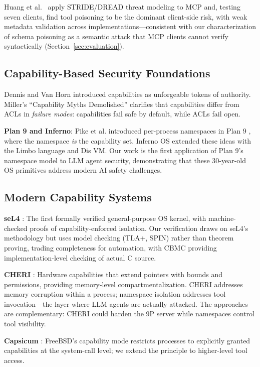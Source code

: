 \documentclass[acmsmall,screen,review]{acmart}
\begin{document}
Huang et al.\ \cite{huang2026mcpthreat} apply STRIDE/DREAD threat modeling to MCP and, testing seven clients, find tool poisoning to be the dominant client-side risk, with weak metadata validation across implementations---consistent with our characterization of schema poisoning as a semantic attack that MCP clients cannot verify syntactically (Section~\ref{sec:evaluation}).

\subsection{Capability-Based Security Foundations}

Dennis and Van Horn \cite{dennis1966capabilities} introduced capabilities as unforgeable tokens of authority. Miller's ``Capability Myths Demolished'' \cite{miller2006capability} clarifies that capabilities differ from ACLs in \textit{failure modes}: capabilities fail safe by default, while ACLs fail open.

\textbf{Plan 9 and Inferno}: Pike et al. introduced per-process namespaces in Plan 9 \cite{pike1990plan9}, where the namespace \textit{is} the capability set. Inferno OS \cite{dorward1997inferno} extended these ideas with the Limbo language and Dis VM. Our work is the first application of Plan 9's namespace model to LLM agent security, demonstrating that these 30-year-old OS primitives address modern AI safety challenges.

\subsection{Modern Capability Systems}

\textbf{seL4} \cite{klein2009sel4}: The first formally verified general-purpose OS kernel, with machine-checked proofs of capability-enforced isolation. Our verification draws on seL4's methodology but uses model checking (TLA+, SPIN) rather than theorem proving, trading completeness for automation, with CBMC providing implementation-level checking of actual C source.

\textbf{CHERI} \cite{woodruff2014cheri}: Hardware capabilities that extend pointers with bounds and permissions, providing memory-level compartmentalization. CHERI addresses memory corruption within a process; namespace isolation addresses tool invocation---the layer where LLM agents are actually attacked. The approaches are complementary: CHERI could harden the 9P server while namespaces control tool visibility.

\textbf{Capsicum} \cite{watson2010capsicum}: FreeBSD's capability mode restricts processes to explicitly granted capabilities at the system-call level; we extend the principle to higher-level tool access.
\end{document}

